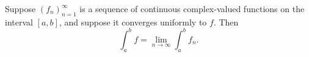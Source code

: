 Suppose $(f_n)_{n=1}^{\infty}$ is a sequence of continuous complex-valued functions on the interval $[a, b]$, and suppose it converges uniformly to $f$. Then
$$
\int_a^b f = \lim_{n \to \infty} \int_a^b f_n.
$$
